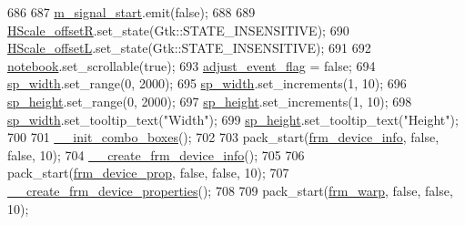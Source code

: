 \begin{DoxyCode}
686 
687         \hyperlink{class_v_s_s_s___g_u_i_1_1_v4_l_interface_a106a19f83b60b118984f3aece410d140}{m\_signal\_start}.emit(\textcolor{keyword}{false});
688 
689         \hyperlink{class_v_s_s_s___g_u_i_1_1_v4_l_interface_a50fa202e4b9ec95b2c009a324aea10fb}{HScale\_offsetR}.set\_state(Gtk::STATE\_INSENSITIVE);
690         \hyperlink{class_v_s_s_s___g_u_i_1_1_v4_l_interface_a7261b87cb8ad1293c79003c48c99558a}{HScale\_offsetL}.set\_state(Gtk::STATE\_INSENSITIVE);
691 
692         \hyperlink{class_v_s_s_s___g_u_i_1_1_v4_l_interface_a658017c295c18a779272aa6182664da5}{notebook}.set\_scrollable(\textcolor{keyword}{true});
693         \hyperlink{class_v_s_s_s___g_u_i_1_1_v4_l_interface_a52efea2776e5a4c8af47ca2d43dd75a5}{adjust\_event\_flag} = \textcolor{keyword}{false};
694         \hyperlink{class_v_s_s_s___g_u_i_1_1_v4_l_interface_a0f492cb2c65c4021c9b9b81f4a185e84}{sp\_width}.set\_range(0, 2000);
695         \hyperlink{class_v_s_s_s___g_u_i_1_1_v4_l_interface_a0f492cb2c65c4021c9b9b81f4a185e84}{sp\_width}.set\_increments(1, 10);
696         \hyperlink{class_v_s_s_s___g_u_i_1_1_v4_l_interface_a7b095a3a9dc7a5895f3bac68b05b8210}{sp\_height}.set\_range(0, 2000);
697         \hyperlink{class_v_s_s_s___g_u_i_1_1_v4_l_interface_a7b095a3a9dc7a5895f3bac68b05b8210}{sp\_height}.set\_increments(1, 10);
698         \hyperlink{class_v_s_s_s___g_u_i_1_1_v4_l_interface_a0f492cb2c65c4021c9b9b81f4a185e84}{sp\_width}.set\_tooltip\_text(\textcolor{stringliteral}{"Width"});
699         \hyperlink{class_v_s_s_s___g_u_i_1_1_v4_l_interface_a7b095a3a9dc7a5895f3bac68b05b8210}{sp\_height}.set\_tooltip\_text(\textcolor{stringliteral}{"Height"});
700 
701         \hyperlink{class_v_s_s_s___g_u_i_1_1_v4_l_interface_ab0ec02e9be4c0642bd05cb227ec7c8b8}{\_\_init\_combo\_boxes}();
702 
703         pack\_start(\hyperlink{class_v_s_s_s___g_u_i_1_1_v4_l_interface_acc87fe0a73e532e097a6fba14668950a}{frm\_device\_info}, \textcolor{keyword}{false}, \textcolor{keyword}{false}, 10);
704         \hyperlink{class_v_s_s_s___g_u_i_1_1_v4_l_interface_a91c4e5aea234b253ed674e0ae5bfdd33}{\_\_create\_frm\_device\_info}();
705 
706         pack\_start(\hyperlink{class_v_s_s_s___g_u_i_1_1_v4_l_interface_a5f4e313c287e18402de5918558a3f33e}{frm\_device\_prop}, \textcolor{keyword}{false}, \textcolor{keyword}{false}, 10);
707         \hyperlink{class_v_s_s_s___g_u_i_1_1_v4_l_interface_ae878d432706af05ddc9afe849739327e}{\_\_create\_frm\_device\_properties}();
708 
709         pack\_start(\hyperlink{class_v_s_s_s___g_u_i_1_1_v4_l_interface_af5db2099d80d5ef2fcc1d97417e6ce72}{frm\_warp}, \textcolor{keyword}{false}, \textcolor{keyword}{false}, 10);

\end{DoxyCode}
